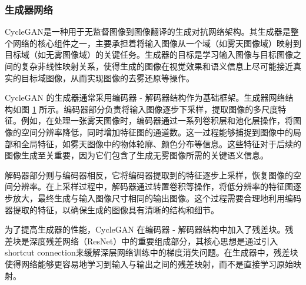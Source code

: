 \subsubsection{生成器网络}

CycleGAN是一种用于无监督图像到图像翻译的生成对抗网络架构。其生成器是整个网络的核心组件之一，主要承担着将输入图像从一个域（如雾天图像域）映射到目标域（如无雾图像域）的关键任务。生成器的目标是学习输入图像与目标图像之间的复杂非线性映射关系，使得生成的图像在视觉效果和语义信息上尽可能接近真实的目标域图像，从而实现图像的去雾还原等操作。

CycleGAN 的生成器通常采用编码器 - 解码器结构作为基础框架。生成器网络结构如图 \ref{fig:gnet} 所示。编码器部分负责将输入图像逐步下采样，提取图像的多尺度特征。例如，在处理一张雾天图像时，编码器通过一系列卷积层和池化层操作，将图像的空间分辨率降低，同时增加特征图的通道数。这一过程能够捕捉到图像中的局部和全局特征，如雾天图像中的物体轮廓、颜色分布等信息。这些特征对于后续的图像生成至关重要，因为它们包含了生成无雾图像所需的关键语义信息。

解码器部分则与编码器相反，它将编码器提取到的特征逐步上采样，恢复图像的空间分辨率。在上采样过程中，解码器通过转置卷积等操作，将低分辨率的特征图逐步放大，最终生成与输入图像尺寸相同的输出图像。这个过程需要合理地利用编码器提取的特征，以确保生成的图像具有清晰的结构和细节。

\begin{figure}[htb]
    \centering
    \captionsetup{font=footnotesize}
    \label{fig:gnet}
\end{figure}

为了提高生成器的性能，CycleGAN 在编码器 - 解码器结构中加入了残差块。残差块是深度残差网络（ResNet）中的重要组成部分，其核心思想是通过引入 shortcut connection来缓解深层网络训练中的梯度消失问题。在生成器中，残差块使得网络能够更容易地学习到输入与输出之间的残差映射，而不是直接学习原始映射。

